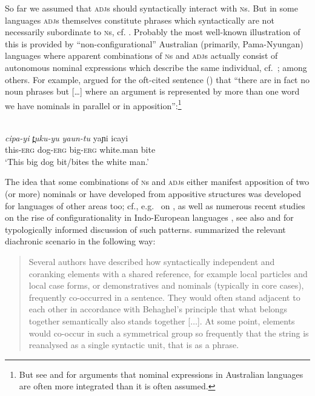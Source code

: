 \documentclass[output=paper,nobabel,draftmode  ,colorlinks, citecolor=brown]{langscibook}
\begin{document}
So far we assumed that \textsc{adj}s should syntactically interact with \textsc{n}s. But in some
languages \textsc{adj}s themselves constitute phrases which syntactically are not necessarily
subordinate to \textsc{n}s, cf.  \citet*[13--14]{Riessler2016}. Probably the most well-known
illustration of this is provided by ``non-configurational'' Australian (primarily, Pama-Nyungan)
languages where apparent combinations of \textsc{n}s and \textsc{adj}s actually consist of
autonomous nominal expressions which describe the same individual, cf.\ \citet{Blake1983};
\citet{Heath1984} among others. For example, \citet*[145]{Blake1983} argued for the oft-cited
sentence () that ``there are in fact no noun phrases but [\ldots] where an argument is represented by
more than one word we have nominals in parallel or in apposition'':\footnote{But see \citet{LouagieVerstraete2016} and \citet{Blake2001} for arguments that nominal expressions in Australian languages are often more integrated than it is often assumed.} 


\ea
{}\\
\gll \emph{cipa-yi }      \emph{t̪uku-yu}	\emph{yaun-tu}	yaɲi	       icayi\\ 
     this-\textsc{erg}	dog-\textsc{erg}	big-\textsc{erg}	white.man	bite \\
\glt `This big dog bit/bites the white man.'
\z

\noindent
The idea that some combinations of \textsc{n}s and \textsc{adj}s either manifest apposition of two
(or more) nominals or have developed from appositive structures was developed for languages of other
areas too; cf., e.g.\ \citet*[651-654]{Testelec1998} on , as well as numerous recent studies
on the rise of configurationality in Indo-European languages \parencites{Luraghi2010, Ledgeway2012,
  Spevak2015, Reinoehl2016}, see also \citet*[19--22]{Rijkhoff2002} and
\citet{LouagieReinoehl2022} for typologically informed discussion of such patterns. \citet*[46]{Reinoehl2016} summarized the relevant diachronic scenario in the following way:

\begin{quote}
    Several authors have described how syntactically independent and coranking elements with a shared reference, for example local particles and local case forms, or demonstratives and nominals (typically in core cases), frequently co-occurred in a sentence. They would often stand adjacent to each other in accordance with Behaghel's principle that what belongs together semantically also stands together [$\dots$]. At some point, elements would co-occur in such a symmetrical group so frequently that the string is reanalysed as a single syntactic unit, that is as a phrase. \citep[46]{Reinoehl2016}
\end{quote}
\end{document}
